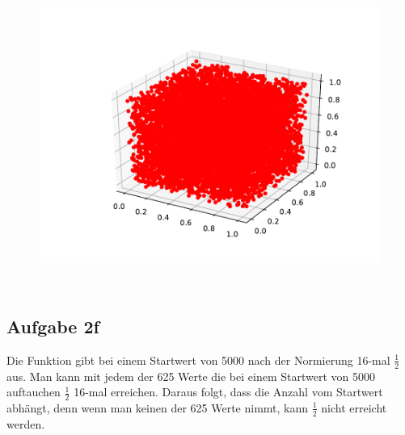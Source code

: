 \begin{figure}[H]
  \includegraphics[height=10cm]{Python/Aufgabe2e3.pdf}
\end{figure}

\subsection*{Aufgabe 2f}
Die Funktion gibt bei einem Startwert von 5000 nach der Normierung 16-mal $\frac{1}{2}$ aus. Man kann mit jedem der 625 Werte die bei einem Startwert von 5000 auftauchen $\frac{1}{2}$ 16-mal erreichen. Daraus folgt, dass die Anzahl vom Startwert abhängt, denn wenn man keinen der 625 Werte nimmt, kann $\frac{1}{2}$ nicht erreicht werden.

